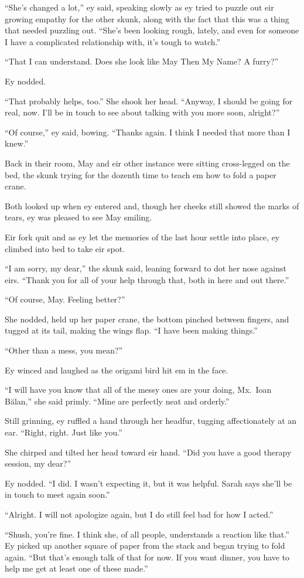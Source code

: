 ``She's changed a lot,'' ey said, speaking slowly as ey tried to puzzle out eir growing empathy for the other skunk, along with the fact that this was a thing that needed puzzling out. ``She's been looking rough, lately, and even for someone I have a complicated relationship with, it's tough to watch.''

``That I can understand. Does she look like May Then My Name? A furry?''

Ey nodded.

``That probably helps, too.'' She shook her head. ``Anyway, I should be going for real, now. I'll be in touch to see about talking with you more soon, alright?''

``Of course,'' ey said, bowing. ``Thanks again. I think I needed that more than I knew.''

Back in their room, May and eir other instance were sitting cross-legged on the bed, the skunk trying for the dozenth time to teach em how to fold a paper crane.

Both looked up when ey entered and, though her cheeks still showed the marks of tears, ey was pleased to see May smiling.

Eir fork quit and as ey let the memories of the last hour settle into place, ey climbed into bed to take eir spot.

``I am sorry, my dear,'' the skunk said, leaning forward to dot her nose against eirs. ``Thank you for all of your help through that, both in here and out there.''

``Of course, May. Feeling better?''

She nodded, held up her paper crane, the bottom pinched between fingers, and tugged at its tail, making the wings flap. ``I have been making things.''

``Other than a mess, you mean?''

Ey winced and laughed as the origami bird hit em in the face.

``I will have you know that all of the messy ones are your doing, Mx.~Ioan Bălan,'' she said primly. ``Mine are perfectly neat and orderly.''

Still grinning, ey ruffled a hand through her headfur, tugging affectionately at an ear. ``Right, right. Just like you.''

She chirped and tilted her head toward eir hand. ``Did you have a good therapy session, my dear?''

Ey nodded. ``I did. I wasn't expecting it, but it was helpful. Sarah says she'll be in touch to meet again soon.''

``Alright. I will not apologize again, but I do still feel bad for how I acted.''

``Shush, you're fine. I think she, of all people, understands a reaction like that.'' Ey picked up another square of paper from the stack and began trying to fold again. ``But that's enough talk of that for now. If you want dinner, you have to help me get at least one of these made.''

